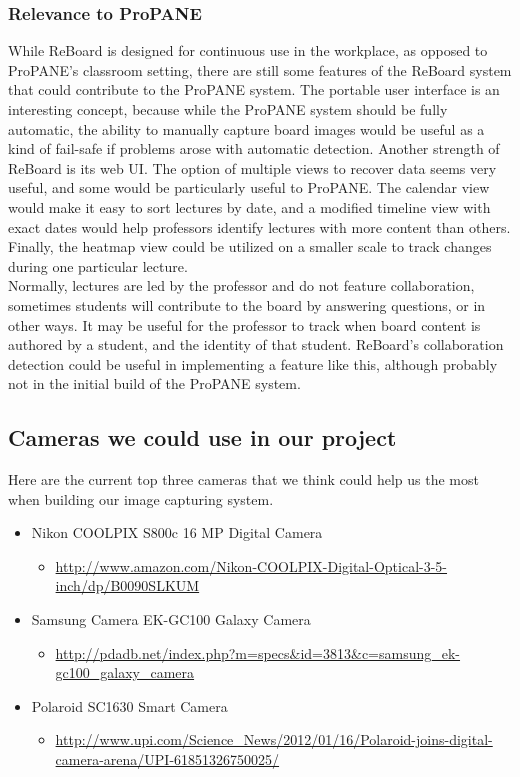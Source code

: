 \documentclass{article}
\begin{document}
	\subsubsection*{Relevance to ProPANE}
While ReBoard is designed for continuous use in the workplace, as opposed to ProPANE's classroom setting, there are still some features of the ReBoard system that could contribute to the ProPANE system.  The portable user interface is an interesting concept, because while the ProPANE system should be fully automatic, the ability to manually capture board images would be useful as a kind of fail-safe if problems arose with automatic detection.  Another strength of ReBoard is its web UI.  The option of multiple views to recover data seems very useful, and some would be particularly useful to ProPANE.  The calendar view would make it easy to sort lectures by date, and a modified timeline view with exact dates would help professors identify lectures with more content than others.  Finally, the heatmap view could be utilized on a smaller scale to track changes during one particular lecture.   \\
\indent Normally, lectures are led by the professor and do not feature collaboration, sometimes students will contribute to the board by answering questions, or in other ways.  It may be useful for the professor to track when board content is authored by a student, and the identity of that student.  ReBoard's collaboration detection could be useful in implementing a feature like this, although probably not in the initial build of the ProPANE system.  \\


  \subsection*{Cameras we could use in our project}
Here are the current top three cameras that we think could help us the most when building our image capturing system.

\begin{itemize}
    \item Nikon COOLPIX S800c 16 MP Digital Camera
    \begin{itemize}
        \item \url{http://www.amazon.com/Nikon-COOLPIX-Digital-Optical-3-5-inch/dp/B0090SLKUM}
    \end{itemize}
    \item Samsung Camera EK-GC100 Galaxy Camera
    \begin{itemize}
        \item \url{http://pdadb.net/index.php?m=specs&id=3813&c=samsung_ek-gc100_galaxy_camera}
    \end{itemize}
    \item Polaroid SC1630 Smart Camera
    \begin{itemize}
        \item \url{http://www.upi.com/Science_News/2012/01/16/Polaroid-joins-digital-camera-arena/UPI-61851326750025/}
    \end{itemize}
\end{itemize}
\end{document}
